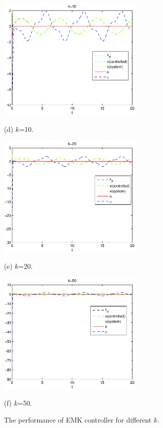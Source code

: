 \documentclass[12pt,a4paper]{article}
\begin{document}
\begin{figure}
\begin{minipage}{0.48\linewidth}
  \centerline{\includegraphics[width=7cm]{figs/emk10.eps}}
  \centerline{(d) $k$=10.}
\end{minipage}
\vfill
\begin{minipage}{0.48\linewidth}\footnotesize
  \centerline{\includegraphics[width=7cm]{figs/emk20.eps}}
  \centerline{(e) $k$=20.}
\end{minipage}
\hfill
\begin{minipage}{0.48\linewidth}\footnotesize
  \centerline{\includegraphics[width=7cm]{figs/emk50.eps}}
  \centerline{(f) $k$=50.}
\end{minipage}
\vfill
\caption{The performance of EMK controller for different $k$.}
\label{emk_fig}
\end{figure}
\end{document}
